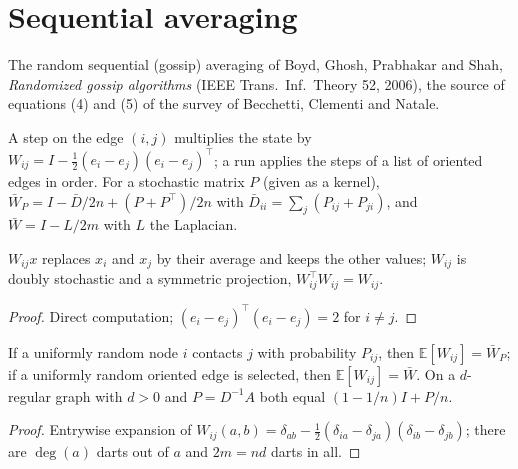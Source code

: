 \section{Sequential averaging}\label{sec:bgps-gossip}
The random sequential (gossip) averaging of Boyd, Ghosh, Prabhakar and Shah, \emph{Randomized
gossip algorithms} (IEEE Trans.\ Inf.\ Theory 52, 2006), the source of equations (4) and (5) of
the survey of Becchetti, Clementi and Natale.
\begin{definition}\label{def:edge-matrix}
\leanok
A step on the edge $(i,j)$ multiplies the state by $W_{ij}=I-\frac12(e_i-e_j)(e_i-e_j)^\top$;
a run applies the steps of a list of oriented edges in order. For a stochastic matrix $P$
(given as a kernel), $\bar W_P=I-\bar D/2n+(P+P^\top)/2n$ with
$\bar D_{ii}=\sum_j(P_{ij}+P_{ji})$, and $\bar W=I-L/2m$ with $L$ the Laplacian.
\end{definition}
\begin{lemma}\label{lem:edge-matrix}
\leanok{}
$W_{ij}x$ replaces $x_i$ and $x_j$ by their average and keeps the other values; $W_{ij}$ is
doubly stochastic and a symmetric projection, $W_{ij}^\top W_{ij}=W_{ij}$.
\end{lemma}
\begin{proof}\leanok
Direct computation; $(e_i-e_j)^\top(e_i-e_j)=2$ for $i\ne j$.
\end{proof}
\begin{theorem}\label{thm:mean-step}
\leanok{}
If a uniformly random node $i$ contacts $j$ with probability $P_{ij}$, then
$\mathbb E[W_{ij}]=\bar W_P$; if a uniformly random oriented edge is selected, then
$\mathbb E[W_{ij}]=\bar W$. On a $d$-regular graph with $d>0$ and $P=D^{-1}A$ both equal
$(1-1/n)I+P/n$.
\end{theorem}
\begin{proof}\leanok
Entrywise expansion of $W_{ij}(a,b)=\delta_{ab}-\frac12(\delta_{ia}-\delta_{ja})(\delta_{ib}-\delta_{jb})$;
there are $\deg(a)$ darts out of $a$ and $2m=nd$ darts in all.
\end{proof}
